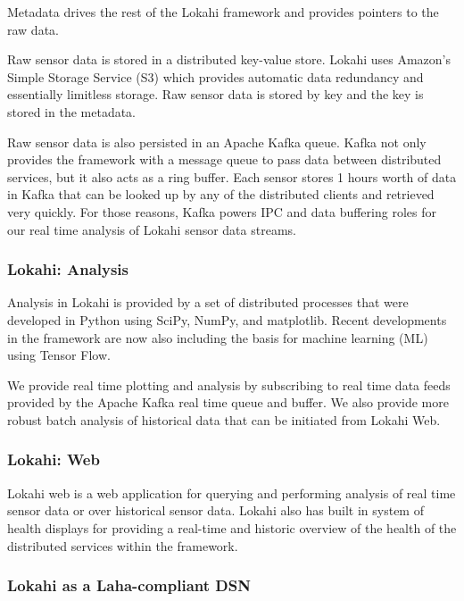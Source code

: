 Metadata drives the rest of the Lokahi framework and provides pointers to the raw data.

Raw sensor data is stored in a distributed key-value store. Lokahi uses Amazon's Simple Storage Service (S3) which provides automatic data redundancy and essentially limitless storage. Raw sensor data is stored by key and the key is stored in the metadata.

Raw sensor data is also persisted in an Apache Kafka queue. Kafka not only provides the framework with a message queue to pass data between distributed services, but it also acts as a ring buffer. Each sensor stores 1 hours worth of data in Kafka that can be looked up by any of the distributed clients and retrieved very quickly. For those reasons, Kafka powers IPC and data buffering roles for our real time analysis of Lokahi sensor data streams.  

\subsubsection{Lokahi: Analysis}
Analysis in Lokahi is provided by a set of distributed processes that were developed in Python using SciPy, NumPy, and matplotlib. Recent developments in the framework are now also including the basis for machine learning (ML) using Tensor Flow.

We provide real time plotting and analysis by subscribing to real time data feeds provided by the Apache Kafka real time queue and buffer. We also provide more robust batch analysis of historical data that can be initiated from Lokahi Web.


\subsubsection{Lokahi: Web}
Lokahi web is a web application for querying and performing analysis of real time sensor data or over historical sensor data. Lokahi also has built in system of health displays for providing a real-time and historic overview of the health of the distributed services within the framework. 


\subsubsection{Lokahi as a Laha-compliant DSN}


